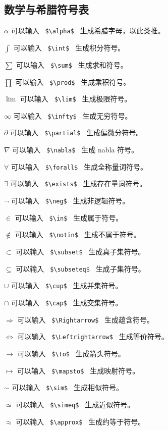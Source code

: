\documentclass{article}
\begin{document}
\begin{CJK*}{UTF8}{gbsn}
		\section{数学与希腊符号表}
		\begin{flushleft}
		$\alpha$ 可以输入 \verb | $\alpha$ | 生成希腊字母，以此类推。 \par
		$\int$ 可以输入 \verb | $\int$ | 生成积分符号。 \par
		$\sum$ 可以输入 \verb | $\sum$ | 生成求和符号。 \par
		$\prod$ 可以输入 \verb | $\prod$ | 生成乘积符号。 \par
		$\lim$ 可以输入 \verb | $\lim$ | 生成极限符号。 \par
		$\infty$ 可以输入 \verb | $\infty$ | 生成无穷符号。 \par
		$\partial$ 可以输入 \verb | $\partial$ | 生成偏微分符号。 \par
		$\nabla$ 可以输入 \verb | $\nabla$ | 生成 nabla 符号。 \par
		$\forall$ 可以输入 \verb | $\forall$ | 生成全称量词符号。 \par
		$\exists$ 可以输入 \verb | $\exists$ | 生成存在量词符号。 \par
		$\neg$ 可以输入 \verb | $\neg$ | 生成非逻辑符号。 \par
		$\in$ 可以输入 \verb | $\in$ | 生成属于符号。 \par
		$\notin$ 可以输入 \verb | $\notin$ | 生成不属于符号。 \par
		$\subset$ 可以输入 \verb | $\subset$ | 生成真子集符号。 \par
		$\subseteq$ 可以输入 \verb | $\subseteq$ | 生成子集符号。 \par
		$\cup$ 可以输入 \verb | $\cup$ | 生成并集符号。 \par
		$\cap$ 可以输入 \verb | $\cap$ | 生成交集符号。 \par
		$\Rightarrow$ 可以输入 \verb | $\Rightarrow$ | 生成蕴含符号。 \par
		$\Leftrightarrow$ 可以输入 \verb | $\Leftrightarrow$ | 生成等价符号。 \par
		$\to$ 可以输入 \verb | $\to$ | 生成箭头符号。 \par
		$\mapsto$ 可以输入 \verb | $\mapsto$ | 生成映射符号。 \par
		$\sim$ 可以输入 \verb | $\sim$ | 生成相似符号。 \par
		$\simeq$ 可以输入 \verb | $\simeq$ | 生成近似符号。 \par
		$\approx$ 可以输入 \verb | $\approx$ | 生成约等于符号。 \par

\end{flushleft}
\end{CJK*}
\end{document}
